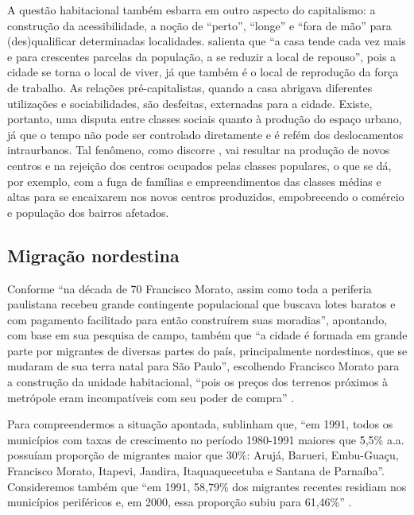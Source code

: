 	A questão habitacional também esbarra em outro aspecto do capitalismo: a construção da acessibilidade, a noção de ``perto'', ``longe'' e ``fora de mão'' para (des)qualificar determinadas localidades.  salienta que ``a casa tende cada vez mais e para crescentes parcelas da população, a se reduzir a local de repouso'', pois a cidade se torna o local de viver, já que também é o local de reprodução da força de trabalho. As relações pré-capitalistas, quando a casa abrigava diferentes utilizações e sociabilidades, são desfeitas, externadas para a cidade. Existe, portanto, uma disputa entre classes sociais quanto à produção do espaço urbano, já que o tempo não pode ser controlado diretamente e é refém dos deslocamentos intraurbanos. Tal fenômeno, como discorre , vai resultar na produção de novos centros e na rejeição dos centros ocupados pelas classes populares, o que se dá, por exemplo, com a fuga de famílias e empreendimentos das classes médias e altas para se encaixarem nos novos centros produzidos, empobrecendo o comércio e população dos bairros afetados.
	
	\subsection{Migração nordestina}
	
	Conforme  ``na década de 70 Francisco Morato, assim como toda a periferia paulistana recebeu
	grande contingente populacional que buscava lotes baratos e com pagamento facilitado para então construírem suas moradias'', apontando, com base em sua pesquisa de campo, também que ``a cidade é formada em grande parte por migrantes de diversas partes do país, principalmente nordestinos, que se mudaram de sua terra natal para São Paulo'', escolhendo Francisco Morato para a  construção da unidade habitacional, ``pois os preços dos terrenos próximos à metrópole eram incompatíveis com seu poder de compra'' .
	
	Para compreendermos a situação apontada,  sublinham que, ``em 1991, todos os municípios com taxas de crescimento no período 1980-1991 maiores que 5,5\% a.a. possuíam proporção de migrantes maior que	30\%: Arujá, Barueri, Embu-Guaçu, Francisco Morato, Itapevi, Jandira, Itaquaquecetuba e Santana de Parnaíba''. Consideremos também que ``em 1991, 58,79\% dos migrantes recentes residiam nos municípios periféricos e, em 2000, essa proporção subiu para 61,46\%'' \cite[p.32]{pasternak2005a}.
	
